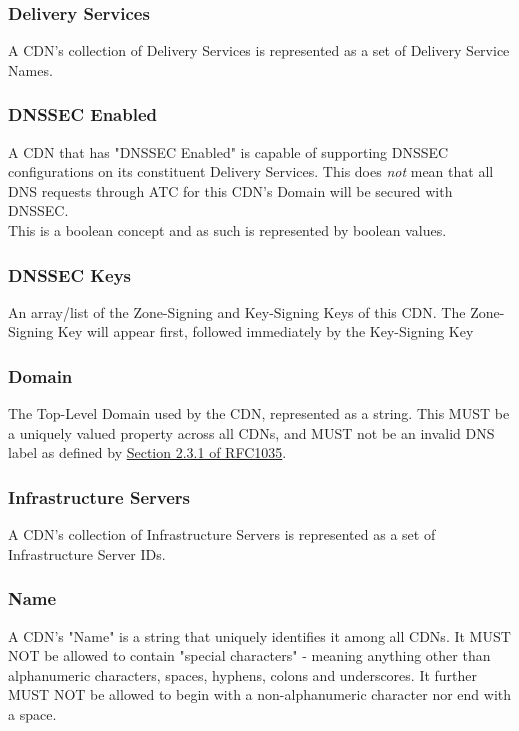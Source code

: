 \subsubsection{Delivery Services}
A CDN's collection of Delivery Services is represented as a set of Delivery
Service Names.

\subsubsection{DNSSEC Enabled}
A CDN that has "DNSSEC Enabled" is capable of supporting DNSSEC configurations
on its constituent Delivery Services. This does \emph{not} mean that all DNS
requests through ATC for this CDN's Domain will be secured with DNSSEC.\\
This is a boolean concept and as such is represented by boolean values.

\subsubsection{DNSSEC Keys}
An array/list of the Zone-Signing and Key-Signing Keys of this CDN. The
Zone-Signing Key will appear first, followed immediately by the Key-Signing Key

\subsubsection{Domain}
The Top-Level Domain used by the CDN, represented as a string. This MUST be a
uniquely valued property across all CDNs, and MUST not be an invalid DNS label
as defined by
\href{https://tools.ietf.org/html/rfc1035#section-2.3.1}{Section 2.3.1 of RFC1035}.

\subsubsection{Infrastructure Servers}
A CDN's collection of Infrastructure Servers is represented as a set of
Infrastructure Server IDs.

\subsubsection{Name}
A CDN's "Name" is a string that uniquely identifies it among all CDNs. It MUST
NOT be allowed to contain "special characters" - meaning anything other than
alphanumeric characters, spaces, hyphens, colons and underscores. It further
MUST NOT be allowed to begin with a non-alphanumeric character nor end with a
space.

